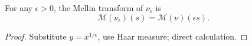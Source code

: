 \begin{theorem}[MellinOfDeltaSpike]
\label{MellinOfDeltaSpike}
\leanok
For any $\epsilon>0$, the Mellin transform of $\nu_\epsilon$ is
  $$\mathcal{M}(\nu_\epsilon)(s) = \mathcal{M}(\nu)\left(\epsilon s\right).$$
\end{theorem}
\begin{proof}
\leanok
Substitute $y=x^{1/\epsilon}$, use Haar measure; direct calculation.
\end{proof}
